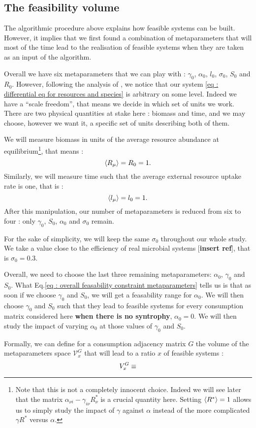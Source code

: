 \documentclass[12pt, titlepage]{report}
\begin{document}
\subsection{The feasibility volume}
The algorithmic procedure above explains how feasible systems can be built. However, it implies that we first found a combination of metaparameters that will most of the time lead to the realisation of feasible systems when they are taken as an input of the algorithm.

Overall we have six metaparameters that we can play with : $\gamma_0$, $\alpha_0$, $l_0$, $\sigma_0$, $S_0$ and $R_0$. However, following the analysis of \cite{barbier_cavity_2017}, we notice that our system \eqref{eq : differential eq for resources and species} is arbitrary on some level. Indeed we have a ``scale freedom'', that means we decide in which set of units we work. There are two physical quantities at stake here : biomass and time, and we may choose, however we want it, a specific set of units describing both of them.

We will measure biomass in units of the average resource abundance at equilibrium\footnote{Note that this is not a completely innocent choice. Indeed we will see later that the matrix $\alpha_{\nu i}-\gamma_{i \nu} R^*_\nu$ is a crucial quantity here. Setting $\langle R^* \rangle=1$ allows us to simply study the impact of $\gamma$ against $\alpha$ instead of the more complicated $\gamma R^*$ versus $\alpha$.}, that means :
\begin{equation}
 \langle R_\mu \rangle = R_0 = 1.
\end{equation}
Similarly, we will measure time such that the average external resource uptake rate is one, that is :
\begin{equation}
\langle l_\mu \rangle = l_0 = 1.
\end{equation}
After this manipulation, our number of metaparameters is reduced from six to four : only $\gamma_0$, $S_0$, $\alpha_0$ and $\sigma_0$ remain.

For the sake of simplicity, we will keep the same $\sigma_0$ throughout our whole study. We take a value close to the efficiency of real microbial systems [\textbf{insert ref}], that is $\sigma_0 =0.3$.

Overall, we need to choose the last three remaining metaparameters: $\alpha_0$, $\gamma_0$ and $S_0$. What Eq.\eqref{eq : overall feasability constraint metaparameters} tells us is that as soon if we choose $\gamma_0$ and $S_0$, we will get a feasability range for $\alpha_0$.
We will then choose $\gamma_0$ and $S_0$ such that they lead to feasible systems for every consumption matrix considered here \textbf{when there is no syntrophy}, \ie $\alpha_0=0$. We will then study the impact of varying $\alpha_0$ at those values of $\gamma_0$ and $S_0$.

Formally, we can define for a consumption adjacency matrix $G$ the volume of the metaparameters space $\mathcal{V}^G_x$ that will lead to a ratio $x$ of feasible systems \ie :
\begin{equation}
V^G_x \equiv 
\end{equation}
\end{document}
